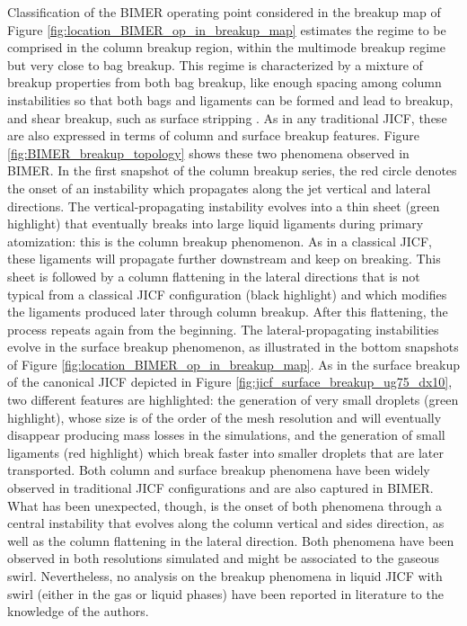 Classification of the BIMER operating point considered in the breakup map of Figure \ref{fig:location_BIMER_op_in_breakup_map} estimates the regime to be comprised in the column breakup region, within the multimode breakup regime but very close to bag breakup. This regime is characterized by a mixture of breakup properties from both bag breakup, like enough spacing among column instabilities so that both bags and ligaments can be formed and lead to breakup, and shear breakup, such as surface stripping . As in any traditional JICF, these are also expressed in terms of column and surface breakup features. Figure \ref{fig:BIMER_breakup_topology} shows these two phenomena observed in BIMER. In the first snapshot of the column breakup series, the red circle denotes the onset of an instability which propagates along the jet vertical and lateral directions. The vertical-propagating instability evolves into a thin sheet (green highlight) that eventually breaks into large liquid ligaments during primary atomization: this is the column breakup phenomenon. As in a classical JICF, these ligaments will propagate further downstream and keep on breaking. This sheet is followed by a column flattening in the lateral directions that is not typical from a classical JICF configuration (black highlight) and which modifies the ligaments produced later through column breakup. After this flattening, the process repeats again from the beginning. The lateral-propagating instabilities evolve in the surface breakup phenomenon, as illustrated in the bottom snapshots of Figure \ref{fig:location_BIMER_op_in_breakup_map}. As in the surface breakup of the canonical JICF depicted in Figure \ref{fig:jicf_surface_breakup_ug75_dx10}, two different features are highlighted: the generation of very small droplets (green highlight), whose size is of the order of the mesh resolution and will eventually disappear producing mass losses in the simulations, and the generation of small ligaments (red highlight) which break faster into smaller droplets that are later transported. Both column and surface breakup phenomena have been widely observed in traditional JICF configurations and are also captured in BIMER. What has been unexpected, though, is the onset of both phenomena through a central instability that evolves along the column vertical and sides direction, as well as the column flattening in the lateral direction. Both phenomena have been observed in both resolutions simulated and might be associated to the gaseous swirl. Nevertheless, no analysis on the breakup phenomena in liquid JICF with swirl (either in the gas or liquid phases) have been reported in literature to the knowledge of the authors.%

